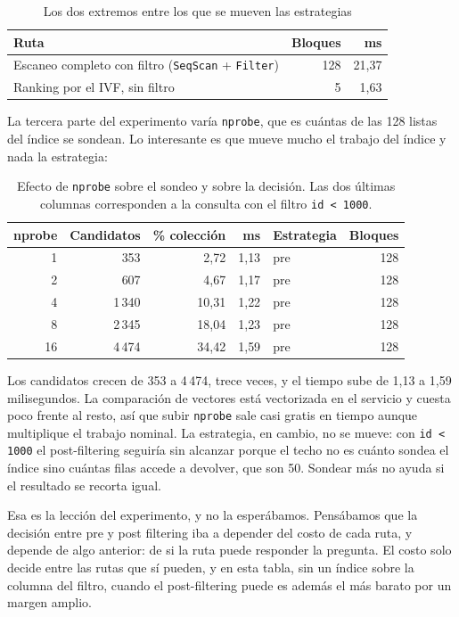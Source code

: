 \begin{table}[H]
\centering
\caption{Los dos extremos entre los que se mueven las estrategias}
\begin{tabular}{@{}lrr@{}}
\toprule
\textbf{Ruta} & \textbf{Bloques} & \textbf{ms} \\
\midrule
Escaneo completo con filtro (\texttt{SeqScan} + \texttt{Filter}) & 128 & 21{,}37 \\
Ranking por el IVF, sin filtro & 5 & 1{,}63 \\
\bottomrule
\end{tabular}
\end{table}

La tercera parte del experimento varía \texttt{nprobe}, que es cuántas de las
128 listas del índice se sondean. Lo interesante es que mueve mucho el trabajo
del índice y nada la estrategia:

\begin{table}[H]
\centering
\caption{Efecto de \texttt{nprobe} sobre el sondeo y sobre la decisión. Las dos
últimas columnas corresponden a la consulta con el filtro
\texttt{id \textless{} 1000}.}
\begin{tabular}{@{}rrrrlr@{}}
\toprule
\textbf{nprobe} & \textbf{Candidatos} & \textbf{\% colección} &
\textbf{ms} & \textbf{Estrategia} & \textbf{Bloques} \\
\midrule
1 & 353 & 2{,}72 & 1{,}13 & pre & 128 \\
2 & 607 & 4{,}67 & 1{,}17 & pre & 128 \\
4 & 1\,340 & 10{,}31 & 1{,}22 & pre & 128 \\
8 & 2\,345 & 18{,}04 & 1{,}23 & pre & 128 \\
16 & 4\,474 & 34{,}42 & 1{,}59 & pre & 128 \\
\bottomrule
\end{tabular}
\end{table}

Los candidatos crecen de 353 a 4\,474, trece veces, y el tiempo sube de 1{,}13 a
1{,}59 milisegundos. La comparación de vectores está vectorizada en el servicio y
cuesta poco frente al resto, así que subir \texttt{nprobe} sale casi gratis en
tiempo aunque multiplique el trabajo nominal. La estrategia, en cambio, no se
mueve: con \texttt{id \textless{} 1000} el post-filtering seguiría sin alcanzar porque el
techo no es cuánto sondea el índice sino cuántas filas accede a devolver, que son
50. Sondear más no ayuda si el resultado se recorta igual.

Esa es la lección del experimento, y no la esperábamos. Pensábamos que la
decisión entre pre y post filtering iba a depender del costo de cada ruta, y
depende de algo anterior: de si la ruta puede responder la pregunta. El costo
solo decide entre las rutas que sí pueden, y en esta tabla, sin un índice sobre
la columna del filtro, cuando el post-filtering puede es además el más barato por
un margen amplio.

